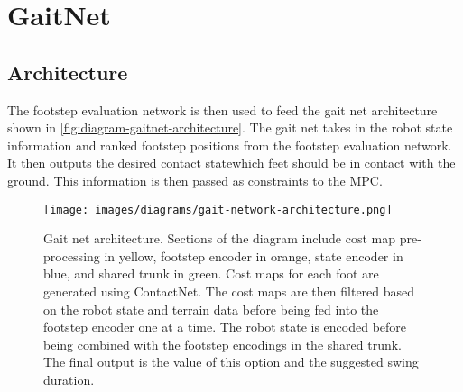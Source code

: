 \section{GaitNet}

\subsection{Architecture}

The footstep evaluation network is then used to feed the gait net
architecture shown in \autoref{fig:diagram-gaitnet-architecture}. The
gait net takes in the robot state information and ranked footstep
positions from the footstep evaluation network. It then outputs the
desired contact state\textemdash which feet should be in contact with
the ground. This information is then passed as constraints to the MPC.

\begin{figure}
  \centering
  \texttt{[image: images/diagrams/gait-network-architecture.png]}
  \caption{Gait net architecture. Sections of the diagram include
    cost map pre-processing in yellow, footstep encoder in orange,
    state encoder in blue, and shared trunk in green. Cost maps for each
    foot are generated using ContactNet. The cost maps are then
    filtered based on the robot state and terrain data before being fed
    into the footstep encoder one at a time. The robot state is encoded
    before being combined with the footstep encodings in the shared
    trunk. The final output is the value of this option and the
  suggested swing duration.}
  \label{fig:diagram-gaitnet-architecture}
\end{figure}


